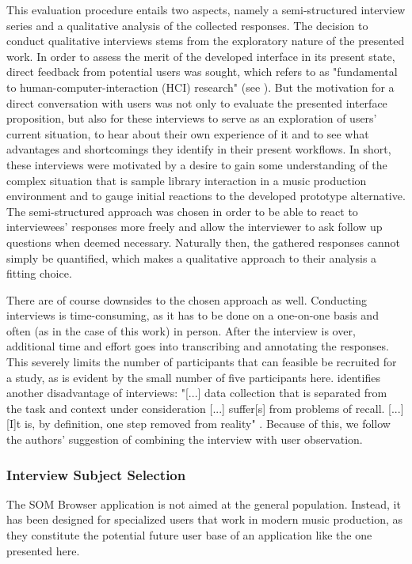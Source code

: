 This evaluation procedure entails two aspects, namely a semi-structured
interview series and a qualitative analysis of the collected responses. The
decision to conduct qualitative interviews stems from the exploratory nature of
the presented work. In order to assess the merit of the developed interface in
its present state, direct feedback from potential users was sought, which
\citet{lazar2017} refers to as "fundamental to human-computer-interaction (HCI)
research" (see \citet[p.187]{lazar2017}). But the motivation for a direct
conversation with users was not only to evaluate the presented interface
proposition, but also for these interviews to serve as an exploration of users'
current situation, to hear about their own experience of it and to see what
advantages and shortcomings they identify in their present workflows. In short,
these interviews were motivated by a desire to gain some understanding of the
complex situation that is sample library interaction in a music production
environment and to gauge initial reactions to the developed prototype
alternative. The semi-structured approach was chosen in order to be able to
react to interviewees' responses more freely and allow the interviewer to ask
follow up questions when deemed necessary. Naturally then, the gathered
responses cannot simply be quantified, which makes a qualitative approach to
their analysis a fitting choice.

\smallskip

There are of course downsides to the chosen approach as well. Conducting
interviews is time-consuming, as it has to be done on a one-on-one basis and
often (as in the case of this work) in person. After the interview is over,
additional time and effort goes into transcribing and annotating the responses.
This severely limits the number of participants that can feasible be recruited
for a study, as is evident by the small number of five participants here.
\citet{lazar2017} identifies another disadvantage of interviews: "[...] data
collection that is separated from the task and context under consideration [...]
suffer[s] from problems of recall. [...] [I]t is, by definition, one step
removed from reality" \citep[p.188ff.]{lazar2017}. Because of this, we follow
the authors' suggestion of combining the interview with user observation.

\subsubsection{Interview Subject Selection}
\label{subsubsec:subject_selection}
The SOM Browser application is not aimed at the general population. Instead, it
has been designed for specialized users that work in modern music production, as
they constitute the potential future user base of an application like the one
presented here.

